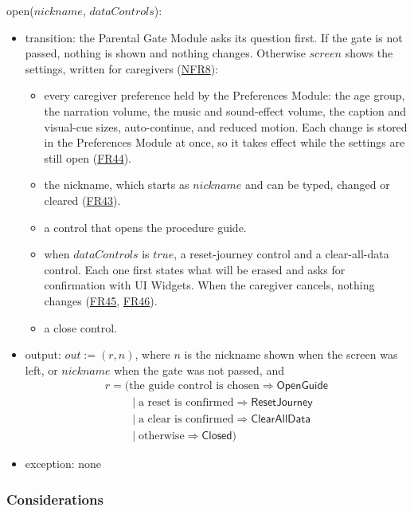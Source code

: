 \documentclass[10pt, titlepage]{article}
\newcommand{\srsurl}{https://team-hindsight.github.io/ophthamology-game/SRS/SRS.pdf}
\newcommand{\srsitemref}[2]{\href{\srsurl\#nameddest=#1}{#2}}
\newcommand{\T}[1]{\mathit{#1}}          %
\newcommand{\V}[1]{\mathsf{#1}}          %
\newcommand{\out}{\mathit{out}}
\newcommand{\true}{\mathit{true}}
\begin{document}
\noindent open($\T{nickname}$, $\T{dataControls}$):
\begin{itemize}
\item transition: the Parental Gate Module asks its question first. If the
  gate is not passed, nothing is shown and nothing changes. Otherwise
  $\T{screen}$ shows the settings, written for caregivers
  (\srsitemref{NFR_Language}{NFR8}):
  \begin{itemize}
  \item every caregiver preference held by the Preferences Module: the age
    group, the narration volume, the music and sound-effect volume, the
    caption and visual-cue sizes, auto-continue, and reduced motion. Each
    change is stored in the Preferences Module at once, so it takes effect
    while the settings are still open (\srsitemref{FR_Preferences}{FR44}).
  \item the nickname, which starts as $\T{nickname}$ and can be typed,
    changed or cleared (\srsitemref{FR_Nickname}{FR43}).
  \item a control that opens the procedure guide.
  \item when $\T{dataControls}$ is $\true$, a reset-journey control and a
    clear-all-data control. Each one first states what will be erased and asks
    for confirmation with UI Widgets. When the caregiver cancels, nothing
    changes (\srsitemref{FR_ResetJourney}{FR45},
    \srsitemref{FR_ClearAllData}{FR46}).
  \item a close control.
  \end{itemize}
\item output: $\out := (r, n)$, where $n$ is the nickname shown when the
  screen was left, or $\T{nickname}$ when the gate was not passed, and
  \[\begin{array}{l}
  r = (\text{the guide control is chosen} \Rightarrow \V{OpenGuide}\\
  \phantom{r = (}\mid \text{a reset is confirmed} \Rightarrow
  \V{ResetJourney}\\
  \phantom{r = (}\mid \text{a clear is confirmed} \Rightarrow
  \V{ClearAllData}\\
  \phantom{r = (}\mid \text{otherwise} \Rightarrow \V{Closed})
  \end{array}\]
\item exception: none
\end{itemize}

\subsubsection{Considerations}
\end{document}
